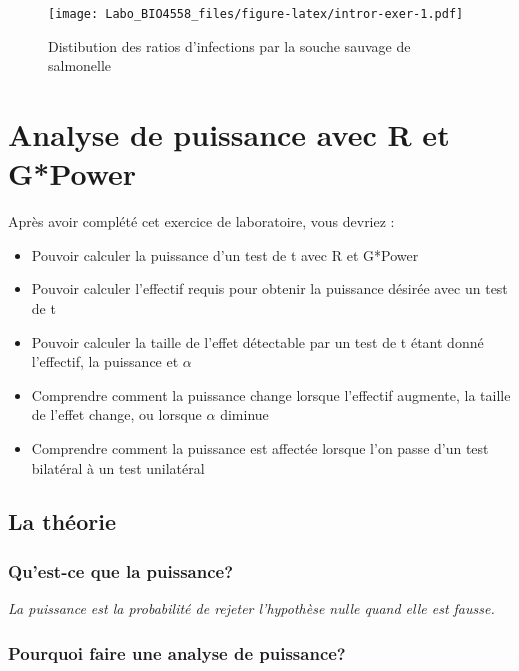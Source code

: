 \documentclass[12pt,]{book}
\providecommand{\tightlist}{%
  \setlength{\itemsep}{0pt}\setlength{\parskip}{0pt}}
\begin{document}
\begin{figure}
\centering
\texttt{[image: Labo\_BIO4558\_files/figure-latex/intror-exer-1.pdf]}
\caption{\label{fig:intror-exer}Distibution des ratios d'infections par la souche sauvage de salmonelle}
\end{figure}

\hypertarget{analyse-de-puissance-avec-r-et-gpower}{%
\chapter{Analyse de puissance avec R et G*Power}\label{analyse-de-puissance-avec-r-et-gpower}}

Après avoir complété cet exercice de laboratoire, vous devriez :

\begin{itemize}
\tightlist
\item
  Pouvoir calculer la puissance d'un test de t avec R et G*Power
\item
  Pouvoir calculer l'effectif requis pour obtenir la puissance désirée avec un test de t
\item
  Pouvoir calculer la taille de l'effet détectable par un test de t étant donné l'effectif, la puissance et \(\alpha\)
\item
  Comprendre comment la puissance change lorsque l'effectif augmente, la taille de l'effet change, ou lorsque \(\alpha\) diminue
\item
  Comprendre comment la puissance est affectée lorsque l'on passe d'un test bilatéral à un test unilatéral
\end{itemize}

\hypertarget{la-thuxe9orie}{%
\section{La théorie}\label{la-thuxe9orie}}

\hypertarget{quest-ce-que-la-puissance}{%
\subsection{Qu'est-ce que la puissance?}\label{quest-ce-que-la-puissance}}

\emph{La puissance est la probabilité de rejeter l'hypothèse nulle quand elle est fausse.}

\hypertarget{pourquoi-faire-une-analyse-de-puissance}{%
\subsection{Pourquoi faire une analyse de puissance?}\label{pourquoi-faire-une-analyse-de-puissance}}
\end{document}

